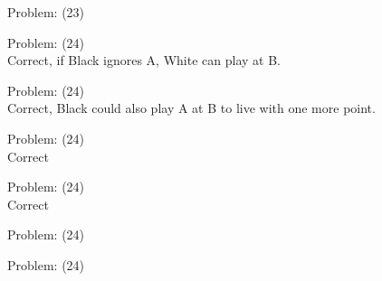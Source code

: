 \documentclass[11pt]{article}
\begin{document}
\begin{minipage}[t]{0.5\textwidth}
  {\centering
  
  Problem: (23)\\
  
  }
\end{minipage}
\begin{minipage}[t]{0.5\textwidth}
  {\centering
  
  Problem: (24)\\
  Correct, if Black ignores A, White can play at B.\\
  }
\end{minipage}
\begin{minipage}[t]{0.5\textwidth}
  {\centering
  
  Problem: (24)\\
  Correct, Black could also play A at B to live with one more point.\\
  }
\end{minipage}
\begin{minipage}[t]{0.5\textwidth}
  {\centering
  
  Problem: (24)\\
  Correct\\
  }
\end{minipage}
\begin{minipage}[t]{0.5\textwidth}
  {\centering
  
  Problem: (24)\\
  Correct\\
  }
\end{minipage}
\begin{minipage}[t]{0.5\textwidth}
  {\centering
  
  Problem: (24)\\
  
  }
\end{minipage}
\begin{minipage}[t]{0.5\textwidth}
  {\centering
  
  Problem: (24)\\
  
  }
\end{minipage}
\end{document}
